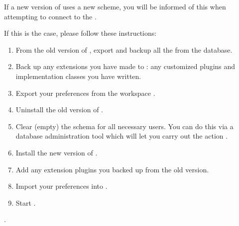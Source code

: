 If a new version of \app{} uses a new \gddb{} scheme, you will be informed of this when attempting to connect to the \gddb{}.




If this is the case, please follow these instructions:

\begin{enumerate}
\item From the old version of \app{}, export and backup all the \gdprojects{} from the database. 
\item Back up any extensions you have made to \app{}: any customized plugins and implementation classes you have written.  
\item Export your \gddb{} preferences from the workspace .
\item Uninstall the old version of \app{}. 
\item Clear (empty) the \gddb{} schema for all necessary \app{} users. You can do this via a database administration tool which will let you carry out the action . 
\item Install the new version of \app{}.
\item Add any extension plugins you backed up from the old version.
\item Import your \gddb{} preferences into \app{}.
\item Start \app{}.  

\end{enumerate}



.
